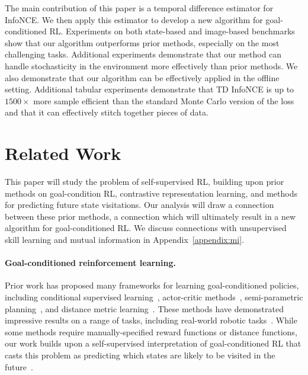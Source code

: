 \documentclass{article} %
\begin{document}
The main contribution of this paper is a temporal difference estimator for InfoNCE. We then apply this estimator to develop a new algorithm for goal-conditioned RL. Experiments on both state-based and image-based benchmarks show that our algorithm outperforms prior methods, especially on the most challenging tasks. Additional experiments demonstrate that our method can handle stochasticity in the environment more effectively than prior methods. We also demonstrate that our algorithm can be effectively applied in the offline setting. Additional tabular experiments demonstrate that TD InfoNCE is up to $1500 \times$ more sample efficient than the standard Monte Carlo version of the loss and that it can effectively stitch together pieces of data.

\section{Related Work}
\label{sec:prior-work}

This paper will study the problem of self-supervised RL, building upon prior methods on goal-condition RL, contrastive representation learning, and methods for predicting future state visitations. Our analysis will draw a connection between these prior methods, a connection which will ultimately result in a new algorithm for goal-conditioned RL. We discuss connections with unsupervised skill learning and mutual information in Appendix~\ref{appendix:mi}.

\paragraph{Goal-conditioned reinforcement learning.} Prior work has proposed many frameworks for learning goal-conditioned policies, including conditional supervised learning~\citep{ding2019goal, ghosh2020learning, gupta2020relay, emmons2021rvs, lynch2020learning, oh2018self, sun2019policy}, actor-critic methods~\cite{andrychowicz2017hindsight, nachum2018data, chane2021goal}, semi-parametric planning~\citep{pertsch2020long, fang2022planning, fang2023generalization, eysenbach2019search, nair2019hierarchical, gupta2020relay}, and distance metric learning~\citep{pmlr-v202-wang23al, tian2020model, nair2020goal, durugkar2021adversarial}.
These methods have demonstrated impressive results on a range of tasks, including real-world robotic tasks~\citep{ma2022vip, shah2022rapid, zheng2023stabilizing}.
While some methods require manually-specified reward functions or distance functions, our work builds upon a self-supervised interpretation of goal-conditioned RL that casts this problem as predicting which states are likely to be visited in the future~\citep{eysenbach2020c, eysenbach2022contrastive, blier2021learning}.%
\end{document}
